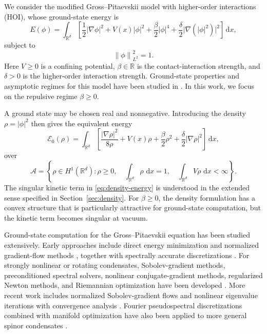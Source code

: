\documentclass[11pt]{article}
\newcommand{\R}{\mathbb{R}}
\newcommand{\A}{\mathcal{A}}
\newcommand{\E}{\mathcal{E}}
\newcommand{\dd}{\,\mathrm{d}}
\newcommand{\norm}[1]{\left\|#1\right\|}
\newcommand{\grad}{\nabla}
\newcommand{\half}{\frac12}
\theoremstyle{plain}
\theoremstyle{definition}
\numberwithin{equation}{section}
\begin{document}
We consider the modified Gross--Pitaevskii model with higher-order
interactions (HOI), whose ground-state energy is
\begin{equation}
\label{eq:wave-energy}
E(\phi)
=
\int_{\R^d}
\left[
\half |\grad\phi|^2
+V(x)|\phi|^2
+\frac{\beta}{2}|\phi|^4
+\frac{\delta}{2}\bigl|\grad(|\phi|^2)\bigr|^2
\right]\dd x,
\end{equation}
subject to
\begin{equation}
\label{eq:wave-mass}
\norm{\phi}_{L^2}^2=1.
\end{equation}
Here $V\ge0$ is a confining potential, $\beta\in\R$ is the
contact-interaction strength, and $\delta>0$ is the higher-order
interaction strength. Ground-state properties and asymptotic regimes
for this model have been studied in
\cite{RuanCaiBao2016,BaoCaiRuan2019}. In this work, we focus on the
repulsive regime $\beta\ge0$.

A ground state may be chosen real and nonnegative. Introducing the
density $\rho=|\phi|^2$ then gives the equivalent energy
\begin{equation}
\label{eq:density-energy}
\E_0(\rho)
=
\int_{\R^d}
\left[
\frac{|\grad\rho|^2}{8\rho}
+V(x)\rho
+\frac{\beta}{2}\rho^2
+\frac{\delta}{2}|\grad\rho|^2
\right]\dd x,
\end{equation}
over
\begin{equation}
\label{eq:admissible-density}
\A
=
\left\{
\rho\in H^1(\R^d):
\rho\ge0,\quad
\int_{\R^d}\rho\,\dd x=1,\quad
\int_{\R^d}V\rho\,\dd x<\infty
\right\}.
\end{equation}
The singular kinetic term in \eqref{eq:density-energy} is understood
in the extended sense specified in Section~\ref{sec:density}.
For $\beta\ge0$, the density formulation has a convex structure that
is particularly attractive for ground-state computation, but the
kinetic term becomes singular at vacuum.

Ground-state computation for the Gross--Pitaevskii equation has been
studied extensively. Early approaches include direct energy
minimization and normalized gradient-flow methods
\cite{BaoTang2003,BaoDu2004}, together with spectrally accurate
discretizations \cite{BaoChernLim2006}. For strongly nonlinear or
rotating condensates, Sobolev-gradient methods, preconditioned
spectral solvers, nonlinear conjugate-gradient methods, regularized
Newton methods, and Riemannian optimization have been developed
\cite{DanailaKazemi2010,AntoineDuboscq2014,
AntoineLevittTang2017,WuWenBao2017,DanailaProtas2017}. More recent work
includes normalized Sobolev-gradient flows and nonlinear eigenvalue
iterations with convergence analysis
\cite{HenningPeterseim2020,AltmannHenningPeterseim2021,
ChenLuLuZhang2024}. Fourier pseudospectral discretizations combined
with manifold optimization have also been applied to more general
spinor condensates \cite{TianCaiWuWen2020}.
\end{document}
